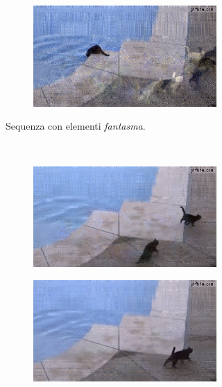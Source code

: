 \documentclass[11pt,a4paper]{article}
\begin{document}
\begin{figure}
\begin{subfigure}[b]{\wid\textwidth}
    \begin{subfigure}[b]{\wid\textwidth}
      \centering
      \includegraphics[keepaspectratio=true, scale=\scal]{Imgs/Cats/frame-12}
    \end{subfigure}
    \caption{Sequenza con elementi \emph{fantasma}.}\label{fig:cats_sequence_phantoms}
  \end{subfigure}
  ~
  \begin{subfigure}[b]{\wid\textwidth}
    \begin{subfigure}[b]{\wid\textwidth}
      \centering
      \includegraphics[keepaspectratio=true, scale=\scal]{Imgs/Cats/frame-105}
    \end{subfigure}
    
    \begin{subfigure}[b]{\wid\textwidth}
      \centering
      \includegraphics[keepaspectratio=true, scale=\scal]{Imgs/Cats/frame-111}
    \end{subfigure}
    

\end{subfigure}
\end{figure}
\end{document}
